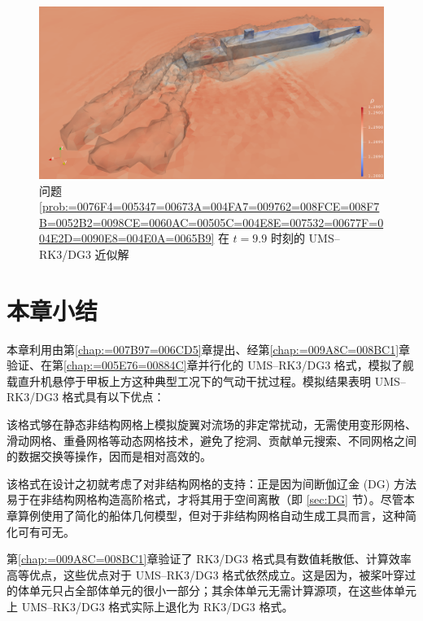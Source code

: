 \begin{figure}[h!]
\begin{centering}
\includegraphics[width=1\textwidth,height=0.28\textheight,keepaspectratio]{figures/ship/a=45_u=10/Frame99}
\par\end{centering}
\caption{\label{fig:ship_u=00003D10_a=00003D45_t=00003D99e-1}问题 \ref{prob:=0076F4=005347=00673A=004FA7=009762=008FCE=008F7B=0052B2=0098CE=0060AC=00505C=004E8E=007532=00677F=004E2D=0090E8=004E0A=0065B9}
在 $t=9.9$ 时刻的 UMS–RK3/DG3 近似解}
\end{figure}

\newpage{}

\section{本章小结}

本章利用由第\ref{chap:=007B97=006CD5}章提出、经第\ref{chap:=009A8C=008BC1}章验证、在第\ref{chap:=005E76=00884C}章并行化的
UMS–RK3/DG3 格式，模拟了舰载直升机悬停于甲板上方这种典型工况下的气动干扰过程。模拟结果表明 UMS–RK3/DG3 格式具有以下优点：
\begin{description}[wide]
\item [{能够高效地模拟旋翼对流场的扰动}] 该格式够在静态非结构网格上模拟旋翼对流场的非定常扰动，无需使用变形网格、滑动网格、重叠网格等动态网格技术，避免了挖洞、贡献单元搜索、不同网格之间的数据交换等操作，因而是相对高效的。
\item [{能够处理具有复杂几何外形的船体}] 该格式在设计之初就考虑了对非结构网格的支持：正是因为间断伽辽金 (DG) 方法易于在非结构网格构造高阶格式，才将其用于空间离散（即
\ref{sec:DG} 节）。尽管本章算例使用了简化的船体几何模型，但对于非结构网格自动生成工具而言，这种简化可有可无。
\item [{数值耗散低、计算效率高}] 第\ref{chap:=009A8C=008BC1}章验证了 RK3/DG3 格式具有数值耗散低、计算效率高等优点，这些优点对于
UMS–RK3/DG3 格式依然成立。这是因为，被桨叶穿过的体单元只占全部体单元的很小一部分；其余体单元无需计算源项，在这些体单元上
UMS–RK3/DG3 格式实际上退化为 RK3/DG3 格式。
\end{description}
%

